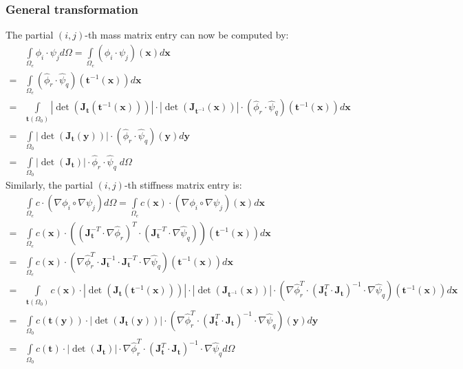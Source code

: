 \documentclass{IOS-Book-Article}
\theoremstyle{plain}
\theoremstyle{definition}
\begin{document}
\subsubsection{General transformation}

The partial $(i, j)$-th mass matrix entry can now be computed by:
\begin{align*}
	& \int \limits_{\Omega_e} \phi_i \cdot \psi_j d\Omega = \int \limits_{\Omega_e} (\phi_i \cdot \psi_j) (\mathbf x) d \mathbf x \\
	=& \int \limits_{\Omega_e} (\hat \phi_r \cdot \hat \psi_q) (\mathbf t^{-1} (\mathbf x)) d \mathbf x \\
	=& \int \limits_{\mathbf t (\Omega_0)} \left| \det(\mathbf J_{\mathbf t}(\mathbf t^{-1} (\mathbf x))) \right| \cdot \left| \det(\mathbf J_{\mathbf{t}^{-1}}(\mathbf x)) \right| \cdot (\hat \phi_r \cdot \hat \psi_q) (\mathbf t^{-1} (\mathbf x)) d \mathbf x \\
	=& \int \limits_{\Omega_0} \left| \det(\mathbf J_{\mathbf t}(\mathbf y)) \right| \cdot (\hat \phi_r \cdot \hat \psi_q) (\mathbf y) d \mathbf y \\
	=& \int \limits_{\Omega_0} \left| \det(\mathbf J_{\mathbf t}) \right| \cdot \hat \phi_r \cdot \hat \psi_q \; d\Omega
\end{align*}
Similarly, the partial $(i, j)$-th stiffness matrix entry is:
\begin{align*}
	& \int \limits_{\Omega_e} c \cdot (\nabla \phi_i \circ \nabla \psi_j) d\Omega = \int \limits_{\Omega_e} c(\mathbf x) \cdot (\nabla \phi_i \circ \nabla \psi_j) (\mathbf x) d\mathbf x \\
	=& \int \limits_{\Omega_e} c(\mathbf x) \cdot \left( (\mathbf J_{\mathbf{t}}^{-T} \cdot \nabla \hat \phi_r)^T \cdot (\mathbf J_{\mathbf{t}}^{-T} \cdot \nabla \hat \psi_q) \right) \left( \mathbf t^{-1} (\mathbf x) \right) d \mathbf x \\
	=& \int \limits_{\Omega_e} c(\mathbf x) \cdot \left( \nabla \hat \phi_r^T \cdot \mathbf J_{\mathbf{t}}^{-1} \cdot \mathbf J_{\mathbf{t}}^{-T} \cdot \nabla \hat \psi_q \right) \left( \mathbf t^{-1} (\mathbf x) \right) d \mathbf x \\
	=& \int \limits_{\mathbf t (\Omega_0)} c(\mathbf x) \cdot \left| \det(\mathbf J_{\mathbf t}(\mathbf t^{-1} (\mathbf x))) \right| \cdot \left| \det(\mathbf J_{\mathbf{t}^{-1}}(\mathbf x)) \right| \cdot \left( \nabla \hat \phi_r^T \cdot (\mathbf J_{\mathbf{t}}^T \cdot \mathbf J_{\mathbf{t}})^{-1} \cdot \nabla \hat \psi_q \right) \left( \mathbf t^{-1} (\mathbf x) \right) d \mathbf x \\
	=& \int \limits_{\Omega_0} c(\mathbf t (\mathbf y)) \cdot \left| \det(\mathbf J_{\mathbf t}(\mathbf y)) \right| \cdot \left( \nabla \hat \phi_r^T \cdot (\mathbf J_{\mathbf{t}}^T \cdot \mathbf J_{\mathbf{t}})^{-1} \cdot \nabla \hat \psi_q \right) \left( \mathbf y \right) d \mathbf y \\
	=& \int \limits_{\Omega_0} c( \mathbf t ) \cdot \left| \det(\mathbf J_{\mathbf t}) \right| \cdot \nabla \hat \phi_r^T \cdot (\mathbf J_{\mathbf{t}}^T \cdot \mathbf J_{\mathbf{t}})^{-1} \cdot \nabla \hat \psi_q d\Omega
\end{align*}
\end{document}
